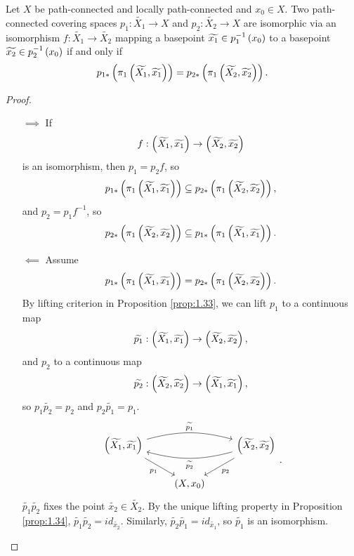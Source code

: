 \begin{proposition}
\label{prop:1.37}
Let $ X $ be path-connected and locally path-connected and $ x_0 \in X $. Two path-connected covering spaces $ p_1 : \widetilde{X_1} \to X $ and $ p_2 : \widetilde{X_2} \to X $ are isomorphic via an isomorphism $ f : \widetilde{X_1} \to \widetilde{X_2} $ mapping a basepoint $ \widetilde{x_1} \in p_1^{-1}\left( x_0 \right) $ to a basepoint $ \widetilde{x_2} \in p_2^{-1}\left( x_0 \right) $ if and only if
$$ p_{1*}\left( \pi_1\left( \widetilde{X_1}, \widetilde{x_1} \right) \right) = p_{2*}\left( \pi_1\left( \widetilde{X_2}, \widetilde{x_2} \right) \right). $$
\end{proposition}

\begin{proof}
\hfill
\begin{itemize}
\item[$ \implies $] If
$$ f : \left( \widetilde{X_1}, \widetilde{x_1} \right) \to \left( \widetilde{X_2}, \widetilde{x_2} \right) $$
is an isomorphism, then $ p_1 = p_2f $, so
$$ p_{1*}\left( \pi_1\left( \widetilde{X_1}, \widetilde{x_1} \right) \right) \subseteq p_{2*}\left( \pi_1\left( \widetilde{X_2}, \widetilde{x_2} \right) \right), $$
and $ p_2 = p_1f^{-1} $, so
$$ p_{2*}\left( \pi_1\left( \widetilde{X_2}, \widetilde{x_2} \right) \right) \subseteq p_{1*}\left( \pi_1\left( \widetilde{X_1}, \widetilde{x_1} \right) \right). $$
\item[$ \impliedby $] Assume
$$ p_{1*}\left( \pi_1\left( \widetilde{X_1}, \widetilde{x_1} \right) \right) = p_{2*}\left( \pi_1\left( \widetilde{X_2}, \widetilde{x_2} \right) \right). $$
By lifting criterion in Proposition \ref{prop:1.33}, we can lift $ p_1 $ to a continuous map
$$ \widetilde{p_1} : \left( \widetilde{X_1}, \widetilde{x_1} \right) \to \left( \widetilde{X_2}, \widetilde{x_2} \right), $$
and $ p_2 $ to a continuous map
$$ \widetilde{p_2} : \left( \widetilde{X_2}, \widetilde{x_2} \right) \to \left( \widetilde{X_1}, \widetilde{x_1} \right), $$
so $ p_1\widetilde{p_2} = p_2 $ and $ p_2\widetilde{p_1} = p_1 $.
$$
\begin{tikzcd}
\rb{\widetilde{X_1}, \widetilde{x_1}} \arrow[bend left=15]{rr}{\widetilde{p_1}} \arrow[swap]{dr}{p_1} & & \rb{\widetilde{X_2}, \widetilde{x_2}} \arrow{dl}{p_2} \arrow[bend left=15]{ll}{\widetilde{p_2}} \\
& \rb{X, x_0} &
\end{tikzcd}.
$$
$ \widetilde{p_1}\widetilde{p_2} $ fixes the point $ \widetilde{x_2} \in \widetilde{X_2} $. By the unique lifting property in Proposition \ref{prop:1.34}, $ \widetilde{p_1}\widetilde{p_2} = id_{\widetilde{x_2}} $. Similarly, $ \widetilde{p_2}\widetilde{p_1} = id_{\widetilde{x_1}} $, so $ \widetilde{p_1} $ is an isomorphism.
\end{itemize}
\end{proof}

